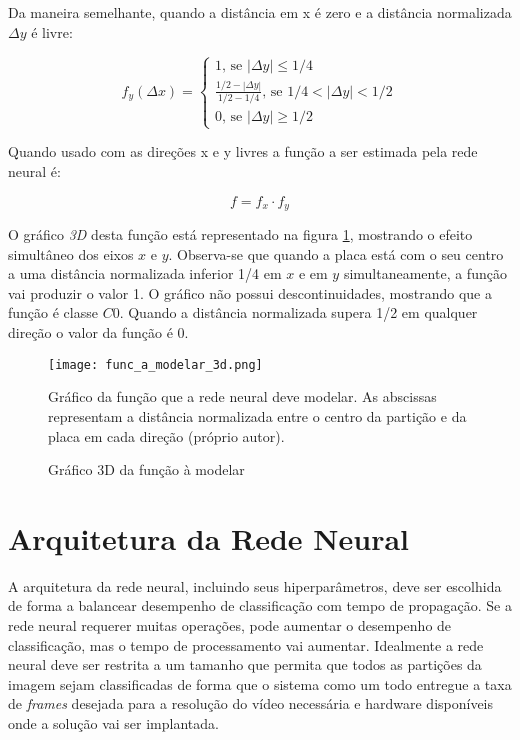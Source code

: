 Da maneira semelhante, quando a distância em x é zero e a distância 
normalizada $\Delta y$ é livre:

\begin{equation}
	f_y(\Delta x) = \begin{cases}
		1 \text{, se } |\Delta y| \leq 1/4
		\\
		\frac{1/2-|\Delta y|}{1/2-1/4} \text{, se } 1/4<|\Delta y|<1/2
		\\
		0 \text{, se } |\Delta y| \geq 1/2
	\end{cases}
\end{equation}

Quando usado com as direções x e y livres a função a ser estimada pela rede
neural é:

\begin{equation} \label{eq:funcao_a_modelar}
	f=f_x \cdot f_y
\end{equation}

O gráfico \emph{3D} desta função está representado na figura
\ref{fig:func_a_modelar_3d}, mostrando o
efeito simultâneo dos eixos $x$ e $y$.  Observa-se que quando a placa
está com o seu centro a uma distância normalizada inferior 1/4 em $x$ e em $y$
simultaneamente, a função vai produzir o valor 1. O gráfico não possui
descontinuidades, mostrando que a função é classe $C0$. Quando a distância
normalizada supera 1/2 em qualquer direção o valor da função é 0.

\begin{figure}[!htb]
	\centering
	\texttt{[image: func\_a\_modelar\_3d.png]}
	\caption{Gráfico 3D da função à modelar}
	\label{fig:func_a_modelar_3d}
	Gráfico da função que a rede neural deve modelar. As abscissas representam
	a distância normalizada entre o centro da partição e da placa em cada
	direção (próprio autor).
\end{figure}


\section{Arquitetura da Rede Neural}

A arquitetura da rede neural, incluindo seus hiperparâmetros, deve ser
escolhida de forma a balancear desempenho de classificação com tempo de
propagação. Se a rede neural requerer muitas operações, pode aumentar o
desempenho de classificação, mas o tempo de processamento vai aumentar.
Idealmente a rede neural deve ser restrita a um tamanho que permita que todos
as partições da imagem sejam classificadas de forma que o sistema como um todo
entregue a taxa de \emph{frames} desejada para a resolução do vídeo necessária
e hardware disponíveis onde a solução vai ser implantada.

